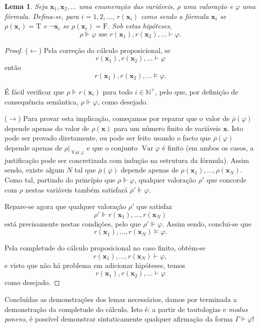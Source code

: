 \documentclass{report}
\newtheorem{lema}{Lema}
\theoremstyle{definition}
\theoremstyle{remark}
\newcommand{\N}{\mathbb{N}}
\renewcommand{\bf}[1]{\mathbf{#1}}
\newcommand{\lt}{\mathrm{T}}
\newcommand{\lf}{\mathrm{F}}
\DeclareMathOperator{\var}{Var}
\begin{document}
	\begin{lema}\label{lema:3}
	Seja $\bf x_1, \bf x_2, \dots$ uma enumeração das variáveis, $\rho$ uma valoração e $\varphi$ uma fórmula. Defina-se, para $i = 1, 2, \dots$, $r(\bf x_i)$ como sendo a fórmula $\bf x_i$ se $\rho(\bf x_i) = \lt$ e $\neg \bf x_i$ se $\rho(\bf x_i) = \lf$. Sob estas hipóteses,
	\[\rho \Vdash \varphi \text{ sse } r(\bf x_1), r(\bf x_2), \dots \vdash \varphi.\]
	\end{lema}
	
	\begin{proof}
	($\leftarrow$) Pela correção do cálculo proposicional, se
	\[r(\bf x_1), r(\bf x_2), \dots \vdash \varphi\]
	então
	\[r(\bf x_1), r(\bf x_2), \dots \vDash \varphi.\]
	
	É fácil verificar que $\rho \Vdash r(\bf x_i)$ para todo $i \in \N^+$, pelo que, por definição de consequência semântica, $\rho \Vdash \varphi$, como desejado.
	
	\medskip
	
	($\rightarrow$) Para provar esta implicação, começamos por reparar que o valor de $\overline\rho(\varphi)$ depende apenas do valor de $\rho(\bf x)$ para um número finito de variáveis $\bf x$. Isto pode ser provado diretamente, ou pode ser feito usando o facto que $\overline\rho(\varphi)$ depende apenas de $\rho|_{\var \varphi}$ e que o conjunto $\var \varphi$ é finito (em ambos os casos, a justificação pode ser concretizada com indução na estrutura da fórmula). Assim sendo, existe algum $N$ tal que $\overline\rho(\varphi)$ depende apenas de $\rho(\bf x_1), \dots, \rho(\bf x_N)$. Como tal, partindo do princípio que $\rho \Vdash \varphi$, qualquer valoração $\rho'$ que concorde com $\rho$ nestas variáveis também satisfará $\rho' \Vdash \varphi$.
	
	Repare-se agora que qualquer valoração $\rho'$ que satisfaz
	\[\rho' \Vdash r(\bf x_1), \dots, r(\bf x_N)\]
	está precisamente nestas condições, pelo que $\rho' \Vdash \varphi$. Assim sendo, conclui-se que
	\[r(\bf x_1), \dots, r(\bf x_N) \vDash \varphi.\]
	
	Pela completude do cálculo proposicional no caso finito, obtém-se
	\[r(\bf x_1), \dots, r(\bf x_N) \vdash \varphi,\]
	e visto que não há problema em adicionar hipóteses, temos
	\[r(\bf x_1), r(\bf x_2), \dots \vdash \varphi\]
	como desejado.
	\end{proof}
	
	Concluídas as demonstrações dos lemas necessários, damos por terminada a demonstração da completude do cálculo. Isto é: a partir de tautologias e \textit{modus ponens}, é possível demonstrar sintaticamente qualquer afirmação da forma $\Gamma \vDash \varphi$!
	
\end{document}
